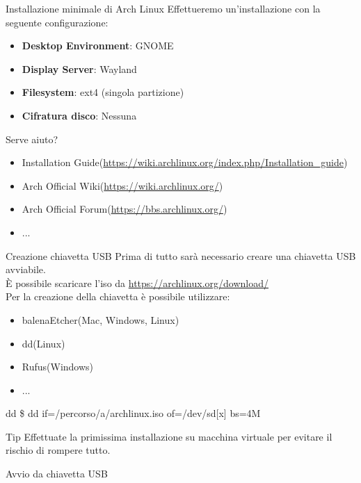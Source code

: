 \begin{frame}{Installazione minimale di Arch Linux}
    Effettueremo un'installazione con la seguente configurazione:
    \begin{itemize}
        \item \textbf{Desktop Environment}: GNOME
        \item \textbf{Display Server}: Wayland
        \item \textbf{Filesystem}: ext4 (singola partizione)
        \item \textbf{Cifratura disco}: Nessuna
    \end{itemize}
\end{frame}


\begin{frame}{Serve aiuto?}
    \begin{itemize}
        \item Installation Guide(\url{https://wiki.archlinux.org/index.php/Installation_guide})
        \item Arch Official Wiki(\url{https://wiki.archlinux.org/})
        \item Arch Official Forum(\url{https://bbs.archlinux.org/})
        \item ...
    \end{itemize}
\end{frame}


\begin{frame}{Creazione chiavetta USB}
    Prima di tutto sarà necessario creare una chiavetta USB avviabile.\\È possibile scaricare l'iso da \url{https://archlinux.org/download/}\\
    Per la creazione della chiavetta è possibile utilizzare:
    \begin{itemize}
        \item balenaEtcher(Mac, Windows, Linux)
        \item dd(Linux)
        \item Rufus(Windows)
        \item ...
    \end{itemize}

    \begin{block}{dd}
        \$ dd if=/percorso/a/archlinux.iso of=/dev/sd[x] bs=4M\\
    \end{block}
    \begin{alertblock}{Tip}
        Effettuate la primissima installazione su macchina virtuale per evitare il rischio di rompere tutto.
    \end{alertblock}
\end{frame}

\begin{frame}{Avvio da chiavetta USB}
    
\end{frame}